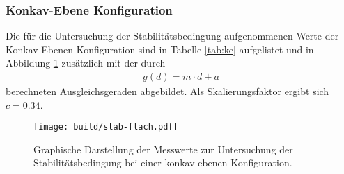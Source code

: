 
\FloatBarrier

\subsubsection{Konkav-Ebene Konfiguration}
Die für die Untersuchung der Stabilitätsbedingung aufgenommenen Werte der
Konkav-Ebenen Konfiguration sind in Tabelle \ref{tab:ke} aufgelistet und
in Abbildung \ref{plt:ke} zusätzlich mit der durch
\begin{align*}
  g(d) = m\cdot d + a
\end{align*}
berechneten Ausgleichsgeraden abgebildet. Als Skalierungsfaktor ergibt
sich $c = \num{0.34}$.

\begin{figure}[htb]
  \centering
  \texttt{[image: build/stab-flach.pdf]}
  \caption{Graphische Darstellung der Messwerte zur Untersuchung der Stabilitätsbedingung bei einer konkav-ebenen Konfiguration.}
  \label{plt:ke}
\end{figure}


\FloatBarrier
